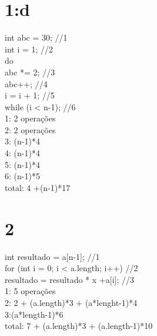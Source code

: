 \documentclass{article}
\def\Plus{\texttt{+}}
\def\Minus{\texttt{-}}
\begin{document}
\section{1:d}
int abc = 30; //1\\
int i = 1; //2\\
do {\\
abc *= 2; //3\\
abc++; //4\\
i = i + 1; //5\\
} while (i < n-1); //6\\
1: 2 operações\\
2: 2 operações\\
3: (n$\Minus$1)*4\\
4: (n$\Minus$1)*4\\
5: (n$\Minus$1)*4\\
6: (n$\Minus$1)*5\\
total: 4 $\Plus$(n$\Minus$1)*17
\section{2}
int resultado = a[n$\Minus$1]; //1\\
for (int i = 0; i < a.length; i$\Plus$$\Plus$) //2\\
 resultado = resultado * x $\Plus$a[i]; //3\\
 1: 5 operações\\
 2: 2 $\Plus$ (a.length)*3 $\Plus$ (a*lenght$\Minus$1)*4\\
 3:(a*length$\Minus$1)*6\\
 total: 7 $\Plus$ (a.length)*3 $\Plus$ (a.length$\Minus$1)*10\\
\end{document}
